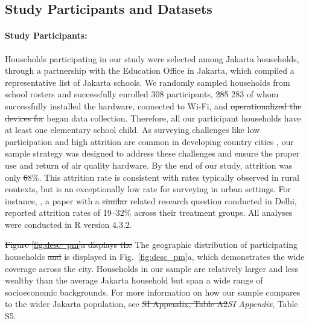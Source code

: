 \documentclass[reqno,12pt,notitlepage]{article}
\providecommand{\DIFadd}[1]{{\protect\color{BLUE}#1}} %
\providecommand{\DIFdel}[1]{{\protect\color{red}\sout{#1}}} %
\providecommand{\DIFaddbegin}{} %
\providecommand{\DIFaddend}{} %
\providecommand{\DIFdelbegin}{} %
\providecommand{\DIFdelend}{} %
\begin{document}
\subsection{Study Participants and Datasets}
\label{ssec:methods_sampling}

\paragraph{Study Participants:} Households participating in our study were selected among Jakarta households, through a partnership with the Education Office in Jakarta, which compiled a representative list of Jakarta schools. We randomly sampled households from school rosters and successfully enrolled 308 participants, \DIFdelbegin \DIFdel{285 }\DIFdelend \DIFaddbegin \DIFadd{283 }\DIFaddend of whom successfully installed the hardware, connected to Wi-Fi, and \DIFdelbegin \DIFdel{operationalized the devices for }\DIFdelend \DIFaddbegin \DIFadd{began }\DIFaddend data collection. Therefore, all our participant households have at least one elementary school child. As surveying challenges like low participation and high attrition are common in developing country cities \citep{greenstone_indoor_2021}, our sample strategy was designed to address these challenges and ensure the proper use and return of air quality hardware. By the end of our study, attrition was only \DIFdelbegin \DIFdel{6}\DIFdelend \DIFaddbegin \DIFadd{8}\DIFaddend \%. This attrition rate is consistent with rates typically observed in rural contexts, but is an exceptionally low rate for surveying in urban settings. For instance, \citep{greenstone_indoor_2021}, a paper with a \DIFdelbegin \DIFdel{similar }\DIFdelend \DIFaddbegin \DIFadd{related }\DIFaddend research question conducted in Delhi, reported attrition rates of 19--32\% across their treatment groups. All analyses were conducted in R version 4.3.2.

\DIFdelbegin \DIFdel{Figure \ref{fig:desc_pm}a displays the }\DIFdelend \DIFaddbegin \DIFadd{The }\DIFaddend geographic distribution of participating households \DIFdelbegin \DIFdel{and }\DIFdelend \DIFaddbegin \DIFadd{is displayed in Fig.\ \ref{fig:desc_pm}a, which }\DIFaddend demonstrates the wide coverage across the city. Households in our sample are relatively larger and less wealthy than the average Jakarta household but span a wide range of socioeconomic backgrounds. For more information on how our sample compares to the wider Jakarta population, see \DIFdelbegin \DIFdel{SI Appendix, Table A2}\DIFdelend \DIFaddbegin \DIFadd{\textit{SI Appendix}, Table S5}\DIFaddend .
\end{document}
